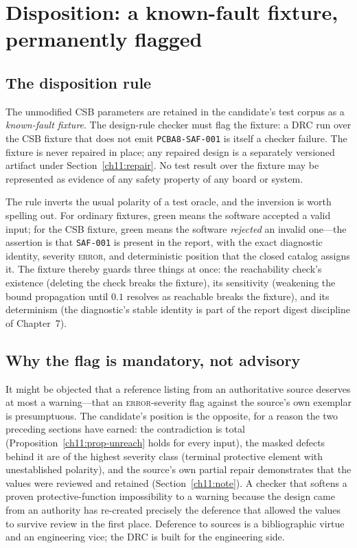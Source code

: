 \section{Disposition: a known-fault fixture, permanently flagged}\label{ch11:disposition}

\subsection{The disposition rule}

\begin{ruleenv}\label{ch11:rule-disposition}
The unmodified CSB parameters are retained in the candidate's test corpus as a \emph{known-fault fixture}. The design-rule checker must flag the fixture: a DRC run over the CSB fixture that does not emit \texttt{PCBA8-SAF-001} is itself a checker failure. The fixture is never repaired in place; any repaired design is a separately versioned artifact under Section~\ref{ch11:repair}. No test result over the fixture may be represented as evidence of any safety property of any board or system.
\end{ruleenv}

The rule inverts the usual polarity of a test oracle, and the inversion is worth spelling out. For ordinary fixtures, green means the software accepted a valid input; for the CSB fixture, green means the software \emph{rejected} an invalid one---the assertion is that \texttt{SAF-001} is present in the report, with the exact diagnostic identity, severity \textsc{error}, and deterministic position that the closed catalog assigns it. The fixture thereby guards three things at once: the reachability check's existence (deleting the check breaks the fixture), its sensitivity (weakening the bound propagation until $0.1$ resolves as reachable breaks the fixture), and its determinism (the diagnostic's stable identity is part of the report digest discipline of Chapter~7).

\subsection{Why the flag is mandatory, not advisory}

It might be objected that a reference listing from an authoritative source deserves at most a warning---that an \textsc{error}-severity flag against the source's own exemplar is presumptuous. The candidate's position is the opposite, for a reason the two preceding sections have earned: the contradiction is total (Proposition~\ref{ch11:prop-unreach} holds for every input), the masked defects behind it are of the highest severity class (terminal protective element with unestablished polarity), and the source's own partial repair demonstrates that the values were reviewed and retained (Section~\ref{ch11:note}). A checker that softens a proven protective-function impossibility to a warning because the design came from an authority has re-created precisely the deference that allowed the values to survive review in the first place. Deference to sources is a bibliographic virtue and an engineering vice; the DRC is built for the engineering side.

